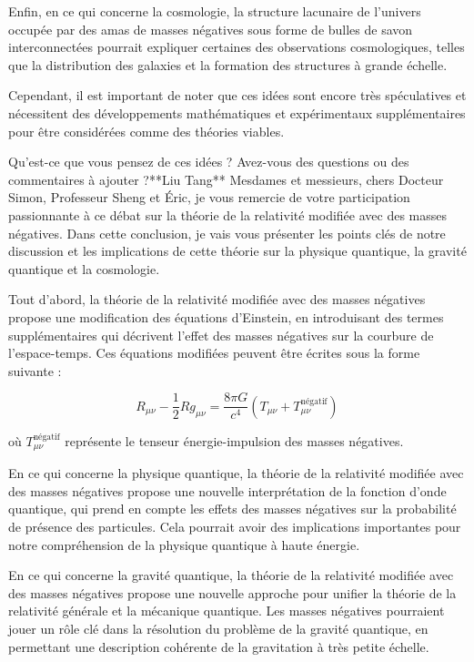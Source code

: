 Enfin, en ce qui concerne la cosmologie, la structure lacunaire de l'univers occupée par des amas de masses négatives sous forme de bulles de savon interconnectées pourrait expliquer certaines des observations cosmologiques, telles que la distribution des galaxies et la formation des structures à grande échelle.

Cependant, il est important de noter que ces idées sont encore très spéculatives et nécessitent des développements mathématiques et expérimentaux supplémentaires pour être considérées comme des théories viables.

Qu'est-ce que vous pensez de ces idées ? Avez-vous des questions ou des commentaires à ajouter ?**Liu Tang**
Mesdames et messieurs, chers Docteur Simon, Professeur Sheng et Éric, je vous remercie de votre participation passionnante à ce débat sur la théorie de la relativité modifiée avec des masses négatives. Dans cette conclusion, je vais vous présenter les points clés de notre discussion et les implications de cette théorie sur la physique quantique, la gravité quantique et la cosmologie.

Tout d'abord, la théorie de la relativité modifiée avec des masses négatives propose une modification des équations d'Einstein, en introduisant des termes supplémentaires qui décrivent l'effet des masses négatives sur la courbure de l'espace-temps. Ces équations modifiées peuvent être écrites sous la forme suivante :

$$R_{\mu\nu} - \frac{1}{2}Rg_{\mu\nu} = \frac{8\pi G}{c^4} (T_{\mu\nu} + T_{\mu\nu}^{\text{négatif}})$$

où $T_{\mu\nu}^{\text{négatif}}$ représente le tenseur énergie-impulsion des masses négatives.

En ce qui concerne la physique quantique, la théorie de la relativité modifiée avec des masses négatives propose une nouvelle interprétation de la fonction d'onde quantique, qui prend en compte les effets des masses négatives sur la probabilité de présence des particules. Cela pourrait avoir des implications importantes pour notre compréhension de la physique quantique à haute énergie.

En ce qui concerne la gravité quantique, la théorie de la relativité modifiée avec des masses négatives propose une nouvelle approche pour unifier la théorie de la relativité générale et la mécanique quantique. Les masses négatives pourraient jouer un rôle clé dans la résolution du problème de la gravité quantique, en permettant une description cohérente de la gravitation à très petite échelle.

